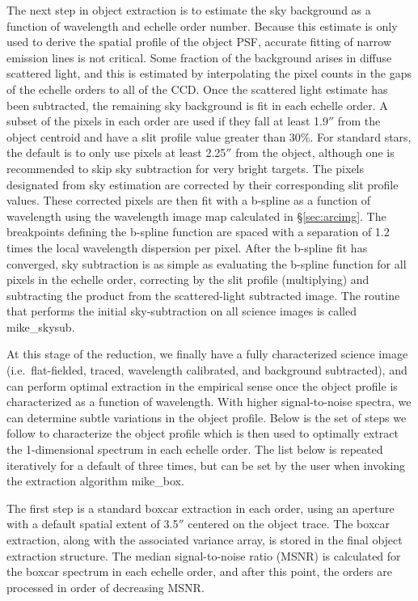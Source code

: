 \documentclass[12pt,preprint]{aastex}
\begin{document}
The next step in object extraction is to estimate the sky
background as a function of wavelength and echelle order number.  
Because this estimate is only used to derive the spatial profile
of the object PSF, accurate fitting of narrow emission lines is not
critical.
Some fraction of the background arises in diffuse scattered light, and
this is estimated by interpolating the pixel counts in the gaps of 
the echelle orders to all of the CCD.  Once the scattered light estimate
has been subtracted, the remaining sky background is fit in each echelle order.
A subset of the pixels in each order are used if they fall at least 1.9$''$ from
the object centroid and have a slit profile value greater than 30\%.
For standard stars, the default is to only use pixels at least 2.25$''$ from the
object, although one is recommended to skip sky subtraction for very
bright targets.  The pixels designated from sky estimation are corrected by their
corresponding slit profile values.  These corrected pixels are then fit 
with a b-spline as a function of wavelength using the wavelength image map 
calculated in \S\ref{sec:arcimg}.  The breakpoints defining the b-spline function
are spaced with a separation of 1.2 times the local wavelength dispersion
per pixel.  After the b-spline fit has converged, sky subtraction is as simple
as evaluating the b-spline function for all pixels in the echelle order, 
correcting by the slit profile (multiplying) and subtracting the product 
from the scattered-light subtracted image.
The routine that performs the initial sky-subtraction on all science images
is called mike\_skysub.

At this stage of the reduction, we finally have a fully characterized 
science image (i.e.\ flat-fielded, traced, 
wavelength calibrated, and background subtracted), 
and can perform optimal extraction in 
the empirical sense \citep[e.g.][]{optimal}
once the object profile is characterized as a function
of wavelength.  With higher signal-to-noise spectra,
we can determine subtle variations in the object profile.
Below is the set of steps we follow to characterize the object profile 
which is then used to optimally extract the 
1-dimensional spectrum in each echelle order. 
The list below is repeated iteratively for a default of three
times, but can be set by the user when invoking the extraction
algorithm mike\_box.


The first step is a standard boxcar extraction in each order, using an aperture
with a default spatial extent of 3.5$''$ centered on the object trace.
The boxcar extraction, along with the associated variance array, is
stored in the final object extraction structure. 
The median signal-to-noise ratio (MSNR) is calculated 
for the boxcar spectrum in each echelle order, and after this point, 
the orders are processed in order of decreasing MSNR. 
\end{document}
